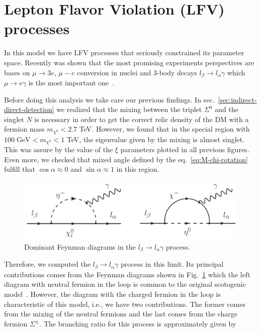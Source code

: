 \documentclass[12pt,letterpaper]{article}
\begin{document}
\section{Lepton Flavor Violation (LFV) processes}
\label{sec:LFV}

In this model we have LFV processes that seriously constrained its parameter space. Recently was shown that the most promising experiments perspectives are bases on $\mu\rightarrow 3 e$, $\mu - e$ conversion in nuclei and 3-body decays $l_{\beta}\rightarrow l_{\alpha}\gamma$ which $\mu\rightarrow e\gamma$ is the most important one~\cite{Rocha-Moran:2016enp}. 

Before doing this analysis we take care our previous findings. In sec.~\ref{sec:indirect-direct-detection} we realized that the mixing between the triplet $\Sigma^0$ and the singlet $N$ is necessary in order to get the correct relic density of the DM with a fermion mass $m_{\chi^0} < 2.7$ TeV. However, we found that in the special region with $100\; \text{GeV} < m_{\chi^0} < 1$ TeV, the eigenvalue given by the mixing is almost singlet. This was assure by the value of the $\xi$ parameters plotted in all previous figures. 
Even more, we checked that mixed angle defined by the eq.~\ref{eq:M-chi-rotation} fulfill that $\cos\alpha\approx 0$ and $\sin\alpha\approx 1$ in this region. 
%
\begin{figure}
\begin{center}
\includegraphics[scale=0.55]{LFV-diagrams}
\caption{Dominant Feynman diagrams in the $l_{\beta}\rightarrow l_{\alpha}\gamma$ process.}
\label{fig:mu-e-gamma}
\end{center}
\end{figure}
%
Therefore, we computed the $l_{\beta}\rightarrow l_{\alpha}\gamma$ process in this limit.
Its principal contributions comes from the Feynman diagrams shown in Fig.~\ref{fig:mu-e-gamma} which the left diagram with neutral fermion in the loop is common to the original scotogenic model~\cite{Toma:2013zsa,Ibarra:2016dlb}. However, the diagram with the charged fermion in the loop is characteristic of this model, i.e., we have two contributions. The former comes from the mixing of the neutral fermions and the last comes from the charge fermion $\Sigma^{\pm}$. The branching ratio for this process is approximately given by
\end{document}

